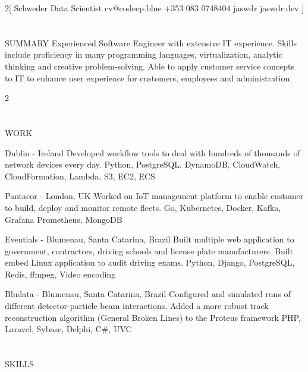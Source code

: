 \documentclass{my_cv}
\begin{document}
\begin{multicols}{2}[
        {Schweder}%
        {Data Scientist}%
        {cv@codeep.blue}%
        {+353 083 0748404}%
        {jaswdr}%
        {jaswdr.dev}%
]
\end{multicols}

\section{\faFileText}{SUMMARY}
Experienced Software Engineer with extensive IT experience. Skills include proficiency in many programming languages, virtualization, analytic thinking and creative problem-solving. Able to apply customer service concepts to IT to enhance user experience for customers, employees and administration.

\begin{multicols}{2}
\section{\faPencil}{WORK}

%
    {Dublin - Ireland}%
    {Developed workflow tools to deal with hundreds of thousands of network devices every day.}
    {Python, PostgreSQL, DynamoDB, CloudWatch, CloudFormation, Lambda, S3, EC2, ECS}

%
    {Pantacor - London, UK}%
    {Worked on IoT management platform to enable customer to build, deploy and monitor remote fleets.}%
    {Go, Kubernetes, Docker, Kafka, Grafana Prometheus, MongoDB}

%
    {Eventials - Blumenau, Santa Catarina, Brazil}%
    {Built multiple web application to government, contractors, driving schools and license plate manufacturers. Built embed Linux application to audit driving exams.}%
    {Python, Django, PostgreSQL, Redis, ffmpeg, Video encoding}

%
    {Bludata - Blumenau, Santa Catarina, Brazil}%
    {Configured and simulated runs of different detector-particle beam interactions. Added a more robust track reconstruction algorithm (General Broken Lines) to the Proteus framework}
    {PHP, Laravel, Sybase, Delphi, C\#, UVC}%

\section{\faList}{SKILLS}


\end{multicols}
\end{document}
